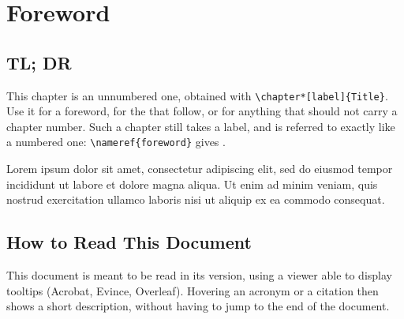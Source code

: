 \chapter*[foreword]{Foreword}

\section*[tldr]{TL; DR}

This chapter is an unnumbered one, obtained with \verb|\chapter*[label]{Title}|.
Use it for a foreword, for the  that follow, or for anything that should not carry a chapter number.
Such a chapter still takes a label, and is referred to exactly like a numbered one: \verb|\nameref{foreword}| gives .

Lorem ipsum dolor sit amet, consectetur adipiscing elit, sed do eiusmod tempor incididunt ut labore et dolore magna aliqua.
Ut enim ad minim veniam, quis nostrud exercitation ullamco laboris nisi ut aliquip ex ea commodo consequat.

\section*[reading_guide]{How to Read This Document}

This document is meant to be read in its  version, using a viewer able to display tooltips (\eg Acrobat, Evince, Overleaf).
Hovering an acronym or a citation then shows a short description, without having to jump to the end of the document.

